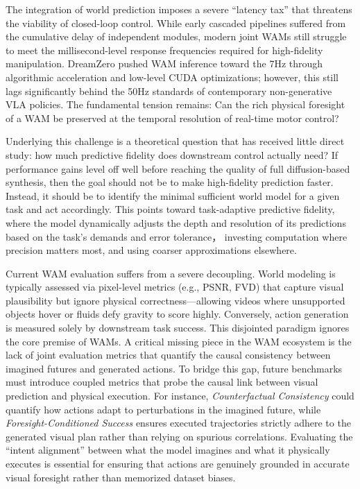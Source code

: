 The integration of world prediction imposes a severe ``latency tax'' that threatens the viability of closed-loop control. While early cascaded pipelines suffered from the cumulative delay of independent modules, modern joint WAMs still struggle to meet the millisecond-level response frequencies required for high-fidelity manipulation. DreamZero pushed WAM inference toward the 7Hz through algorithmic acceleration and low-level CUDA optimizations; however, this still lags significantly behind the 50Hz standards of contemporary non-generative VLA policies. The fundamental tension remains:  Can the rich physical foresight of a WAM be preserved at the temporal resolution of real-time motor control?


Underlying this challenge is a theoretical question that has received little direct study: how much predictive fidelity does downstream control actually need? If performance gains level off well before reaching the quality of full diffusion-based synthesis, then the goal should not be to make high-fidelity prediction faster. Instead, it should be to identify the minimal sufficient world model for a given task and act accordingly. This points toward task-adaptive predictive fidelity, where the model dynamically adjusts the depth and resolution of its predictions based on the task's demands and error tolerance， investing computation where precision matters most, and using coarser approximations elsewhere.


 Current WAM evaluation suffers from a severe decoupling. World modeling is typically assessed via pixel-level metrics (e.g., PSNR, FVD) that capture visual plausibility but ignore physical correctness---allowing videos where unsupported objects hover or fluids defy gravity to score highly. Conversely, action generation is measured solely by downstream task success. This disjointed paradigm ignores the core premise of WAMs. A critical missing piece in the WAM ecosystem is the lack of joint evaluation metrics that quantify the causal consistency between imagined futures and generated actions. To bridge this gap, future benchmarks must introduce coupled metrics that probe the causal link between visual prediction and physical execution. For instance, \textit{Counterfactual Consistency} could quantify how actions adapt to perturbations in the imagined future, while \textit{Foresight-Conditioned Success} ensures executed trajectories strictly adhere to the generated visual plan rather than relying on spurious correlations. Evaluating the ``intent alignment'' between what the model imagines and what it physically executes is essential for ensuring that actions are genuinely grounded in accurate visual foresight rather than memorized dataset biases.


